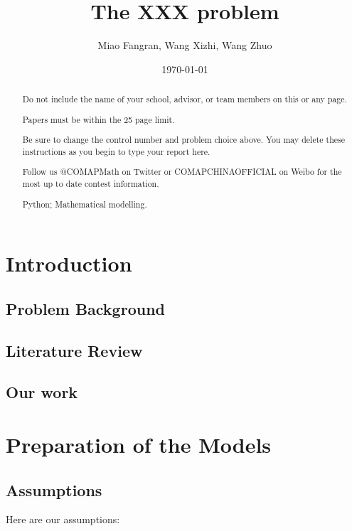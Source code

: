 \documentclass{mcmthesis}
\title{The XXX problem}
\author{Miao Fangran, Wang Xizhi, Wang Zhuo}
\date{\today}
\begin{document}
\begin{abstract}
Do not include the name of your school, advisor, or team members on this or any page.

Papers must be within the 25 page limit.

Be sure to change the control number and problem choice above.
You may delete these instructions as you begin to type your report here.

Follow us @COMAPMath on Twitter or COMAPCHINAOFFICIAL on Weibo for the most up to date contest information.

\begin{keywords}
Python; Mathematical modelling.
\end{keywords}
\end{abstract}
\maketitle
\tableofcontents
\newpage
\section{Introduction}
\subsection{Problem Background}

\subsection{Literature Review}

\subsection{Our work}



\section{Preparation of the Models}
\subsection{Assumptions}
Here are our assumptions:
\end{document}
